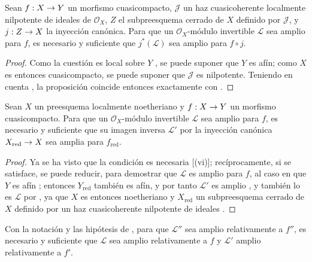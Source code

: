 \documentclass[oneside,10pt]{amsart}
\makeatletter
\newcommand{\ega@arrow}[2]{\mathchoice{#1}{#2}{#2}{#2}}
\renewcommand{\to}{\ega@arrow{\longrightarrow}{\rightarrow}}
\let\EGAOriginalLabel\label
\renewcommand{\label}[1]{\phantomsection\EGAOriginalLabel{#1}}
\makeatother
\begin{document}
\begin{proposition}[4.6.15]
\label{II.4.6.15-fr}
Sean $f:X\to Y$ un morfismo cuasicompacto, $\mathcal{J}$ un haz cuasicoherente localmente nilpotente de ideales de $\mathcal{O}_X$, $Z$ el subpreesquema cerrado de $X$ definido por $\mathcal{J}$, y $j:Z\to X$ la inyección canónica.
Para que un $\mathcal{O}_X$-módulo invertible $\mathcal{L}$ sea amplio para $f$, es necesario y suficiente que $j^*(\mathcal{L})$ sea amplio para $f\circ j$.
\end{proposition}

\begin{proof}
Como la cuestión es local sobre $Y$ , se puede suponer que $Y$ es afín;
como $X$ es entonces cuasicompacto, se puede suponer que $\mathcal{J}$ es nilpotente.
Teniendo en cuenta , la proposición coincide entonces exactamente con .
\end{proof}

\begin{corollary}[4.6.16]
\label{II.4.6.16-fr}
Sean $X$ un preesquema localmente noetheriano y $f:X\to Y$ un morfismo cuasicompacto.
Para que un $\mathcal{O}_X$-módulo invertible $\mathcal{L}$ sea amplio para $f$, es necesario y suficiente que su imagen inversa $\mathcal{L}'$ por la inyección canónica $X_{\mathrm{red}}\to X$ sea amplia para $f_{\mathrm{red}}$.
\end{corollary}

\begin{proof}
Ya se ha visto que la condición es necesaria [(vi)];
recíprocamente, si se satisface, se puede reducir, para demostrar que $\mathcal{L}$ es amplio para $f$, al caso en que $Y$ es afín ;
entonces $Y_{\mathrm{red}}$ también es afín, y por tanto $\mathcal{L}'$ es amplio , y también lo es $\mathcal{L}$ por , ya que $X$ es entonces noetheriano y $X_{\mathrm{red}}$ un subpreesquema cerrado de $X$ definido por un haz cuasicoherente nilpotente de ideales .
\end{proof}

\begin{proposition}[4.6.17]
\label{II.4.6.17-fr}
Con la notación y las hipótesis de , para que $\mathcal{L}''$ sea amplio relativamente a $f''$, es necesario y suficiente que $\mathcal{L}$ sea amplio relativamente a $f$ y $\mathcal{L}'$ amplio relativamente a $f'$.
\end{proposition}
\end{document}
